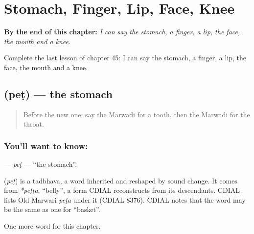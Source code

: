 
\chapter{Stomach, Finger, Lip, Face, Knee}
\label{ch:mw-stomach-finger-lip-face-knee}

\begin{chapteropening}
\textbf{By the end of this chapter:} \emph{I can say the stomach, a finger, a lip, the face, the mouth and a knee.}

Complete the last lesson of chapter 45: I can say the stomach, a finger, a lip, the face, the mouth and a knee.
\end{chapteropening}

\section[\texorpdfstring{\mw{पेट} (peṭ)}{पेट (peṭ)}]{ (peṭ) — the stomach}

\label{lesson:MW-C45-pet}



\begin{quote}
Before the new one: say the Marwadi for a tooth, then the Marwadi for the throat.
\end{quote}

\subsection*{You'll want to know: }
\textbf{} — \emph{peṭ} — \textquotedblleft{}the stomach\textquotedblright{}.

\begin{cousinweb}
\textbf{} (\emph{peṭ}) is a tadbhava, a word inherited and reshaped by sound change. It comes from \emph{*peṭṭa}, \textquotedblleft{}belly\textquotedblright{}, a form CDIAL reconstructs from its descendants. CDIAL lists Old Marwari \emph{peṭa} under it (CDIAL 8376). CDIAL notes that the word may be the same as one for \textquotedblleft{}basket\textquotedblright{}.
\end{cousinweb}

\begin{grammarlens}[title={What you've built}]
One more word for this chapter.
\end{grammarlens}

